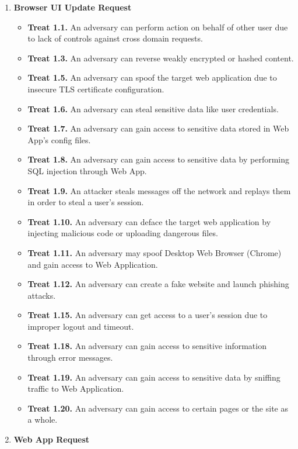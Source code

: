 \begin{enumerate}
    \item \textbf{Browser UI Update Request}
    \begin{itemize}
        \item \textbf{Treat 1.1.} An adversary can perform action on behalf of other user due to lack of controls
        against cross domain requests.
        \item \textbf{Treat 1.3.} An adversary can reverse weakly encrypted or hashed content.
        \item \textbf{Treat 1.5.} An adversary can spoof the target web application due to insecure TLS certificate configuration.
        \item \textbf{Treat 1.6.} An adversary can steal sensitive data like user credentials.
        \item \textbf{Treat 1.7.} An adversary can gain access to sensitive data stored in Web App's config files.
        \item \textbf{Treat 1.8.} An adversary can gain access to sensitive data by performing SQL injection through Web App.
        \item \textbf{Treat 1.9.} An attacker steals messages off the network and replays them in order to steal a user's session.
        \item \textbf{Treat 1.10.} An adversary can deface the target web application by injecting malicious code or uploading dangerous files.
        \item \textbf{Treat 1.11.} An adversary may spoof Desktop Web Browser (Chrome) and gain access to Web Application.
        \item \textbf{Treat 1.12.} An adversary can create a fake website and launch phishing attacks.
        \item \textbf{Treat 1.15.} An adversary can get access to a user's session due to improper logout and timeout.
        \item \textbf{Treat 1.18.} An adversary can gain access to sensitive information through error messages.
        \item \textbf{Treat 1.19.} An adversary can gain access to sensitive data by sniffing traffic to Web Application.
        \item \textbf{Treat 1.20.} An adversary can gain access to certain pages or the site as a whole.
    \end{itemize}
    \item \textbf{Web App Request}
    \begin{itemize}

\end{itemize}
\end{enumerate}

